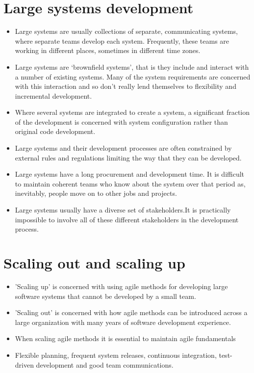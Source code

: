 \section{ Large systems development}
\begin{itemize}

\item Large systems are usually collections of separate, communicating systems, where separate teams develop each system. Frequently, these teams are working in different places, sometimes in different time zones.

\item Large systems are ‘brownfield systems’, that is they include and interact with a number of existing systems. Many of the system requirements are concerned with this interaction and so don’t really lend themselves to flexibility and incremental development.

\item Where several systems are integrated to create a system, a significant fraction of the development is concerned with system configuration rather than original code development.

\item Large systems and their development processes are often constrained by external rules and regulations limiting the way that they can be developed.

\item Large systems have a long procurement and development time. It is difficult to maintain coherent teams who know about the system over that period as, inevitably, people move on to other jobs and projects.

\item Large systems usually have a diverse set of stakeholders.It is practically impossible to involve all of these different stakeholders in the development process.

\end{itemize}
\section{ Scaling out and scaling up}
\begin{itemize}

\item 'Scaling up' is concerned with using agile methods for developing large software systems that cannot be developed by a small team.

\item 'Scaling out' is concerned with how agile methods can be introduced across a large organization with many years of software development experience.

\item When scaling agile methods it is essential to maintain agile fundamentals

\item Flexible planning, frequent system releases, continuous integration, test-driven development and good team communications.
\end{itemize}
